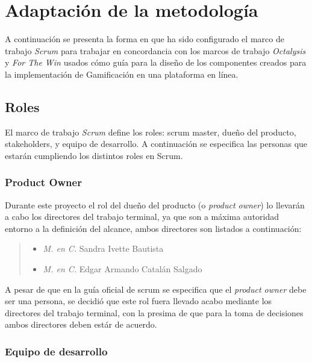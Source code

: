 

\section{Adaptación de la metodología}

 A continuación se presenta la forma en que ha sido configurado el marco de trabajo {\it Scrum}
 para trabajar en concordancia con los marcos de trabajo {\it Octalysis} y {\it For The Win}
 usados cómo guía para la diseño de los componentes creados para la implementación de
 Gamificación en una plataforma en línea.

\subsection{Roles}

 \noindent 
 El marco de trabajo {\it Scrum} define los roles: scrum master, dueño del producto, stakeholders,
 y equipo de desarrollo. A continuación se especifica las personas que estarán cumpliendo los
 distintos roles en Scrum.

\subsubsection{Product Owner}

 Durante este proyecto el rol del dueño del producto (o {\it product owner}) lo llevarán a cabo
 los directores del trabajo terminal, ya que son a máxima autoridad entorno a la definición del
 alcance, ambos directores son listados a continuación:

    \begin{quote}
    \begin{itemize}
        \item {\it M. en C.} Sandra Ivette Bautista
        \item {\it M. en C.} Edgar Armando Catalán Salgado
    \end{itemize}
    \end{quote}

 \noindent 
 A pesar de que en la guía oficial de scrum \cite{TheScrumGuide} se especifica que el {\it
 product owner} debe ser una persona, se decidió que este rol fuera llevado acabo mediante los
 directores del trabajo terminal, con la presima de que para la toma de decisiones ambos
 directores deben estár de acuerdo.

\subsubsection{Equipo de desarrollo}

